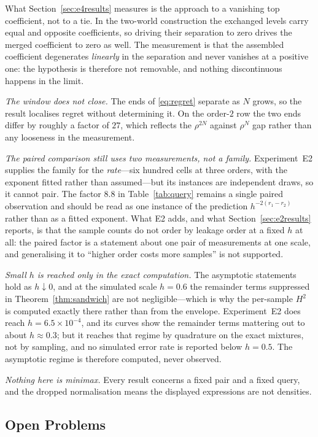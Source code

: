 What Section~\ref{sec:e4results} measures is the approach to a vanishing top coefficient, not
to a tie. In the two-world construction the exchanged levels carry equal and opposite
coefficients, so driving their separation to zero drives the merged coefficient to zero as
well. The measurement is that the assembled coefficient degenerates \emph{linearly} in the
separation and never vanishes at a positive one: the hypothesis is therefore not removable,
and nothing discontinuous happens in the limit.

\emph{The window does not close.} The ends of \eqref{eq:regret} separate as $N$ grows, so the
result localises regret without determining it. On the order-$2$ row the two ends differ by
roughly a factor of $27$, which reflects the $\rho^{2N}$ against $\rho^{N}$ gap rather than
any looseness in the measurement.

\emph{The paired comparison still uses two measurements, not a family.} Experiment~E2 supplies
the family for the \emph{rate}---six hundred cells at three orders, with the exponent fitted
rather than assumed---but its instances are independent draws, so it cannot pair. The factor
$8.8$ in Table~\ref{tab:query} remains a single paired observation and should be read as one
instance of the prediction $h^{-2(r_{1}-r_{2})}$ rather than as a fitted exponent. What E2
adds, and what Section~\ref{sec:e2results} reports, is that the sample counts do not order by
leakage order at a fixed $h$ at all: the paired factor is a statement about one pair of
measurements at one scale, and generalising it to ``higher order costs more samples'' is not
supported.

\emph{Small $h$ is reached only in the exact computation.} The asymptotic statements hold as
$h\downarrow0$, and at the simulated scale $h=0.6$ the remainder terms suppressed in
Theorem~\ref{thm:sandwich} are not negligible---which is why the per-sample $H^{2}$ is computed
exactly there rather than from the envelope. Experiment~E2 does reach $h=6.5\times10^{-4}$, and
its curves show the remainder terms mattering out to about $h\approx0.3$; but it reaches that
regime by quadrature on the exact mixtures, not by sampling, and no simulated error rate is
reported below $h=0.5$. The asymptotic regime is therefore computed, never observed.

\emph{Nothing here is minimax.} Every result concerns a fixed pair and a fixed query, and
the dropped normalisation means the displayed expressions are not densities.

\subsection{Open Problems}

